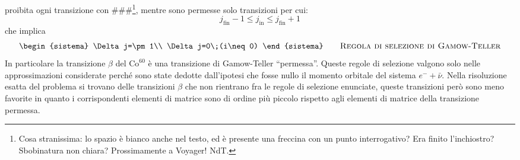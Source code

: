 proibita ogni transizione con \#\#\#\footnote{Cosa stranissima: lo spazio è
bianco anche nel testo, ed è presente una freccina
con un punto interrogativo? Era finito l'inchiostro? Sbobinatura non chiara?
Prossimamente a Voyager! NdT.}, mentre sono permesse solo transizioni per cui:
\[
 j_{\text{fin}}-1\leq j_{\text{in}}\leq j_{\text{fin}}+1
\]
che implica
\[
\begin{sistema}
\Delta j=\pm1\\
\Delta j=0\;(i\neq0)
\end{sistema}\qquad\text{\textsc{Regola di selezione di Gamow-Teller}}
\]
In particolare la transizione $\beta$ del $\text{Co}^{60}$ è una transizione di
Gamow-Teller ``permessa''. Queste regole di selezione valgono solo nelle 
approssimazioni considerate
perché sono state dedotte dall'ipotesi che fosse nullo il momento orbitale del
sistema $e^-+\bar{\nu}$. Nella risoluzione esatta del problema si trovano delle 
transizioni $\beta$ che
non rientrano fra le regole di selezione enunciate, queste transizioni però 
sono
meno favorite in quanto i corrispondenti elementi di matrice sono di ordine più
piccolo rispetto
agli elementi di matrice della transizione permessa.

